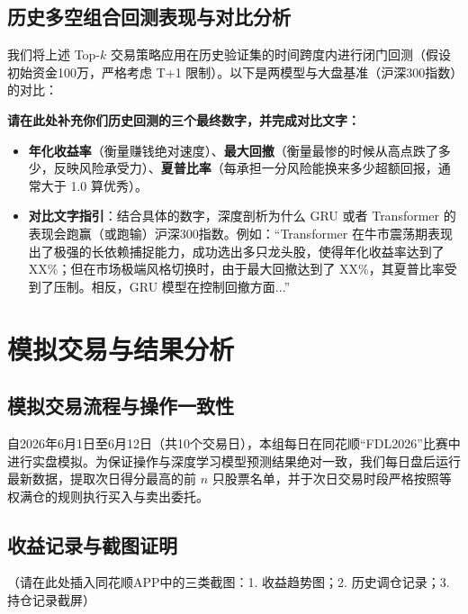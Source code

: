 \documentclass[9pt,a4paper,twoside]{rho-class/rho}
\begin{document}
    \subsection{历史多空组合回测表现与对比分析}
    我们将上述 Top-$k$ 交易策略应用在历史验证集的时间跨度内进行闭门回测（假设初始资金100万，严格考虑 T+1 限制）。以下是两模型与大盘基准（沪深300指数）的对比：

    \begin{rhoenv}[frametitle=填写建议：回测三大指标与实战反思]
    \textbf{请在此处补充你们历史回测的三个最终数字，并完成对比文字：}
    \begin{itemize}
        \item \textbf{年化收益率}（衡量赚钱绝对速度）、\textbf{最大回撤}（衡量最惨的时候从高点跌了多少，反映风险承受力）、\textbf{夏普比率}（每承担一分风险能换来多少超额回报，通常大于 1.0 算优秀）。
        \item \textbf{对比文字指引}：结合具体的数字，深度剖析为什么 GRU 或者 Transformer 的表现会跑赢（或跑输）沪深300指数。例如：“Transformer 在牛市震荡期表现出了极强的长依赖捕捉能力，成功选出多只龙头股，使得年化收益率达到了 XX\%；但在市场极端风格切换时，由于最大回撤达到了 XX\%，其夏普比率受到了压制。相反，GRU 模型在控制回撤方面...”
    \end{itemize}
    \end{rhoenv}

\section{模拟交易与结果分析}

    \subsection{模拟交易流程与操作一致性}
    自2026年6月1日至6月12日（共10个交易日），本组每日在同花顺“FDL2026”比赛中进行实盘模拟。为保证操作与深度学习模型预测结果绝对一致，我们每日盘后运行最新数据，提取次日得分最高的前 $n$ 只股票名单，并于次日交易时段严格按照等权满仓的规则执行买入与卖出委托。

    \subsection{收益记录与截图证明}
    （请在此处插入同花顺APP中的三类截图：1. 收益趋势图；2. 历史调仓记录；3. 持仓记录截屏）
\end{document}
